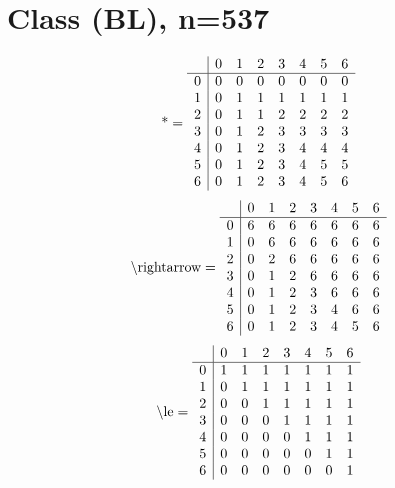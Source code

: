 \documentclass[11pt]{article}
\begin{document}
\section{Class (BL), n=537}
\[\text{*} = 
\begin{array}{r | r r r r r r r}
 & 0 & 1 & 2 & 3 & 4 & 5 & 6 \\ \hline
0 & 0 & 0 & 0 & 0 & 0 & 0 & 0 \\
1 & 0 & 1 & 1 & 1 & 1 & 1 & 1 \\
2 & 0 & 1 & 1 & 2 & 2 & 2 & 2 \\
3 & 0 & 1 & 2 & 3 & 3 & 3 & 3 \\
4 & 0 & 1 & 2 & 3 & 4 & 4 & 4 \\
5 & 0 & 1 & 2 & 3 & 4 & 5 & 5 \\
6 & 0 & 1 & 2 & 3 & 4 & 5 & 6 \\
\end{array}
\]
\[\text{\textbackslash rightarrow} = 
\begin{array}{r | r r r r r r r}
 & 0 & 1 & 2 & 3 & 4 & 5 & 6 \\ \hline
0 & 6 & 6 & 6 & 6 & 6 & 6 & 6 \\
1 & 0 & 6 & 6 & 6 & 6 & 6 & 6 \\
2 & 0 & 2 & 6 & 6 & 6 & 6 & 6 \\
3 & 0 & 1 & 2 & 6 & 6 & 6 & 6 \\
4 & 0 & 1 & 2 & 3 & 6 & 6 & 6 \\
5 & 0 & 1 & 2 & 3 & 4 & 6 & 6 \\
6 & 0 & 1 & 2 & 3 & 4 & 5 & 6 \\
\end{array}
\]
\[\text{\textbackslash le} = 
\begin{array}{r | r r r r r r r}
 & 0 & 1 & 2 & 3 & 4 & 5 & 6 \\ \hline
0 & 1 & 1 & 1 & 1 & 1 & 1 & 1 \\
1 & 0 & 1 & 1 & 1 & 1 & 1 & 1 \\
2 & 0 & 0 & 1 & 1 & 1 & 1 & 1 \\
3 & 0 & 0 & 0 & 1 & 1 & 1 & 1 \\
4 & 0 & 0 & 0 & 0 & 1 & 1 & 1 \\
5 & 0 & 0 & 0 & 0 & 0 & 1 & 1 \\
6 & 0 & 0 & 0 & 0 & 0 & 0 & 1 \\
\end{array}
\]
\end{document}

